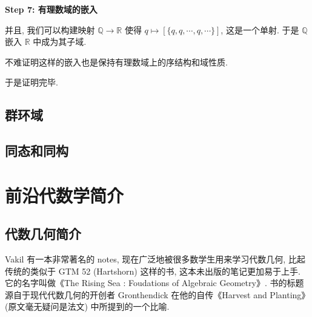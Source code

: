 \documentclass[UTF8]{book}
\begin{document}
\noindent \textbf{Step 7: 有理数域的嵌入}

并且, 我们可以构建映射 
$\mathbb{Q} \to \mathbb{R}$ 使得 $q \mapsto [\{q,q,\cdots,q,\cdots\}]$,
这是一个单射.  
于是 $\mathbb{Q}$ 嵌入 $\mathbb{R}$ 中成为其子域. 

不难证明这样的嵌入也是保持有理数域上的序结构和域性质. 

于是证明完毕. 


\subsection{群环域}






\subsection{同态和同构}




\section{前沿代数学简介}

\subsection{代数几何简介}

\songti
Vakil 有一本非常著名的 notes, 现在广泛地被很多数学生用来学习代数几何, 
比起传统的类似于 GTM 52 (Hartshorn) 这样的书, 这本未出版的笔记更加易于上手. 
它的名字叫做《The Rising Sea : Foudations of Algebraic Geometry》. 
书的标题源自于现代代数几何的开创者 Gronthendick 在他的自传《Harvest and Planting》
(原文毫无疑问是法文) 中所提到的一个比喻. 
\end{document}
